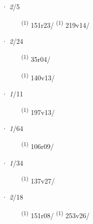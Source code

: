 \ENTRYEND
\noindent{} · \textit{2}/5 \LEMMALINE
\begin{description}
    \item[]  \textsuperscript{(1)} \mbox{151r23/} \CASEBREAK {} \textsuperscript{(1)} \mbox{219v14/}
\end{description}
\ENTRYEND
\noindent{} · \textit{2}/24 \LEMMALINE
\begin{description}
    \item[]  \textsuperscript{(1)} \mbox{35r04/}
    \item[]  \textsuperscript{(1)} \mbox{140v13/}
\end{description}
\ENTRYEND
\noindent{} · \textit{1}/11 \LEMMALINE
\begin{description}
    \item[]  \textsuperscript{(1)} \mbox{197v13/}
\end{description}
\ENTRYEND
\noindent{} · \textit{1}/64 \LEMMALINE
\begin{description}
    \item[]  \textsuperscript{(1)} \mbox{106r09/}
\end{description}
\ENTRYEND
\noindent{} · \textit{1}/34 \LEMMALINE
\begin{description}
    \item[]  \textsuperscript{(1)} \mbox{137v27/}
\end{description}
\ENTRYEND
\noindent{} · \textit{2}/18 \LEMMALINE
\begin{description}
    \item[]  \textsuperscript{(1)} \mbox{151r08/} \CASEBREAK {} \textsuperscript{(1)} \mbox{253v26/}
\end{description}
